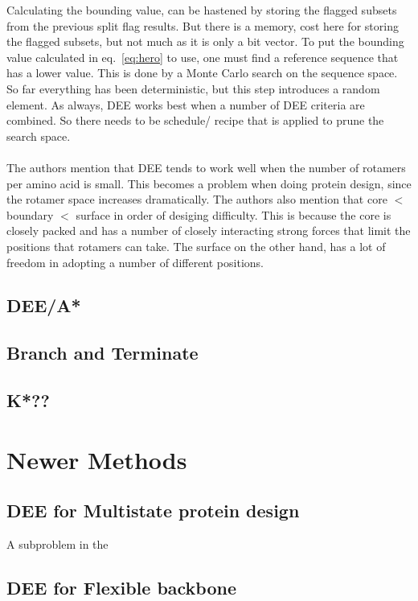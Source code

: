 \documentclass{article}
\begin{document}
Calculating the bounding value, can be hastened by storing the flagged subsets from the previous split flag results. But there is a memory, cost here for storing the flagged subsets, but not much as it is only a bit vector. To put the bounding value calculated in eq.~\ref{eq:hero} to use, one must find a reference sequence that has a lower value. 
This is done by a Monte Carlo search on the sequence space. So far everything has been deterministic, but this step introduces a random element. 
As always, DEE works best when a number of DEE criteria are combined. So there needs to be schedule/ recipe that is applied to prune the search space. 
\\
\\
The authors mention that DEE tends to work well when the number of rotamers per amino acid is small. This becomes a problem when doing protein design, since the rotamer space increases dramatically. 
The authors also mention that  core $<$ boundary $<$ surface in order of desiging difficulty. This is because the core is closely packed and has a number of closely interacting strong forces that limit the positions that rotamers can take. 
The surface on the other hand, has a lot of freedom in adopting a number of different positions. 

\pagebreak

\subsection{DEE/A*}

\subsection{Branch and Terminate}

\subsection{K*??} 

\section{Newer Methods}

\subsection{DEE for Multistate protein design}
A subproblem in the 

\subsection{DEE for Flexible backbone}
\end{document}
